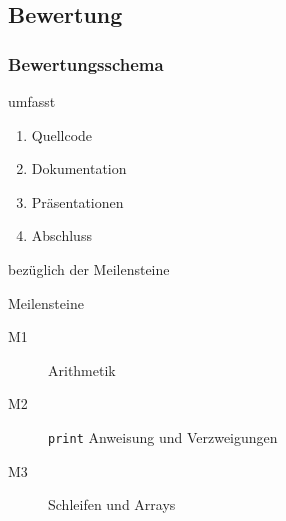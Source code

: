\documentclass[ucs,9pt]{beamer}
\begin{document}
\subsection{Bewertung}
\begin{frame}
    \frametitle{Bewertungsschema}
    umfasst
    \begin{enumerate}
        \item Quellcode
        \item Dokumentation
        \item Präsentationen
        \item Abschluss
    \end{enumerate} bezüglich der Meilensteine
    \begin{block}{Meilensteine}
        \begin{description}
            \item[M1] Arithmetik
            \item[M2] \texttt{print} Anweisung und Verzweigungen
            \item[M3] Schleifen und Arrays
        \end{description}
    \end{block}
\end{frame}
\end{document}
